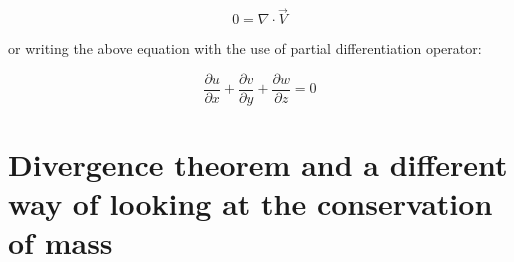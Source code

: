 \begin{equation} \label{eq:continuity_stst_incompressible}
0 = \nabla \cdot \vec{V}
\end{equation}

or writing the above equation with the use of partial differentiation operator:

\begin{equation}
\frac{\partial u}{\partial x} + \frac{\partial v}{\partial y} + \frac{\partial w}{\partial z} = 0
\end{equation}




\section{Divergence theorem and a different way of looking at the conservation of mass}